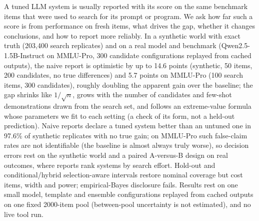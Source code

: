 A tuned LLM system is usually reported with its score on the same benchmark items that were used to search for its prompt or program. We ask how far such a score is from performance on fresh items, what drives the gap, whether it changes conclusions, and how to report more reliably. In a synthetic world with exact truth (203{,}400 search replicates) and on a real model and benchmark (Qwen2.5-1.5B-Instruct on MMLU-Pro, 300 candidate configurations replayed from cached outputs), the naive report is optimistic by up to 14.6 points (synthetic, 50 items, 200 candidates, no true differences) and 5.7 points on MMLU-Pro (100 search items, 300 candidates), roughly doubling the apparent gain over the baseline; the gap shrinks like $1/\sqrt n$, grows with the number of candidates and few-shot demonstrations drawn from the search set, and follows an extreme-value formula whose parameters we fit to each setting (a check of its form, not a held-out prediction). Naive reports declare a tuned system better than an untuned one in 97.6\% of synthetic replicates with no true gain; on MMLU-Pro such false-claim rates are not identifiable (the baseline is almost always truly worse), so decision errors rest on the synthetic world and a paired A-versus-B design on real outcomes, where reports rank systems by search effort. Hold-out and conditional/hybrid selection-aware intervals restore nominal coverage but cost items, width and power; empirical-Bayes disclosure fails. Results rest on one small model, template and ensemble configurations replayed from cached outputs on one fixed 2000-item pool (between-pool uncertainty is not estimated), and no live tool run.
